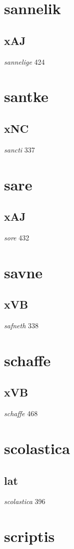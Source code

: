 \documentclass[a4paper,twocolumn]{article}
\begin{document}
\section{sannelik}
\label{sec:org6a46d89}
\subsection{xAJ}
\label{sec:org96b5699}
\emph{sannelige} 424 
\section{santke}
\label{sec:org847d38b}
\subsection{xNC}
\label{sec:orgb722b71}
\emph{sancti} 337 
\section{sare}
\label{sec:orgb789524}
\subsection{xAJ}
\label{sec:org46cd3ce}
\emph{sore} 432 
\section{savne}
\label{sec:orgc42412e}
\subsection{xVB}
\label{sec:orgaa76aba}
\emph{safneth} 338 
\section{schaffe}
\label{sec:org59a3cbc}
\subsection{xVB}
\label{sec:orgee573e7}
\emph{schaffe} 468 
\section{scolastica}
\label{sec:orgbc6c901}
\subsection{lat}
\label{sec:orgb0f8bb2}
\emph{scolastica} 396 
\section{scriptis}
\label{sec:orga1c3fa9}
\end{document}

